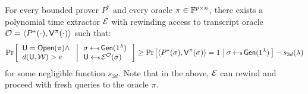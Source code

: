\begin{lemma}[Soundness]\label{lem:proximity3d_sound}
For every bounded prover $P^\ast$ and every oracle $\pi\in \mathbb{F}^{p\times n}$,
there exists a polynomial time extractor $\mathcal{E}$ with rewinding access to
transcript oracle $\mathcal{O}=\langle P^\ast(\cdot),\mathsf{V}^{\pi}(\cdot)\rangle$
such that:
\begin{align*}
\condprob{
\begin{array}{l}
\ewit=\open(\pi) \wedge \\
d(\ewit,\mc{W})>e
\end{array}
}{
\begin{array}{l}
\sigma\sample \gen(\secparam)\\
\ewit\sample \extr^{\mc{O}}(\sigma)
\end{array}
}\geq \condprob{\langle
P^\ast(\sigma),\verifier^\pi(\sigma)\rangle=1}{\sigma\sample
\gen(\secparam)}-s_{3d}(\secpar)
\end{align*}
for some negligible function $s_{3d}$. Note that in the above, $\mathcal{E}$ can
rewind and proceed with fresh queries to the oracle $\pi$. 	
\end{lemma}
